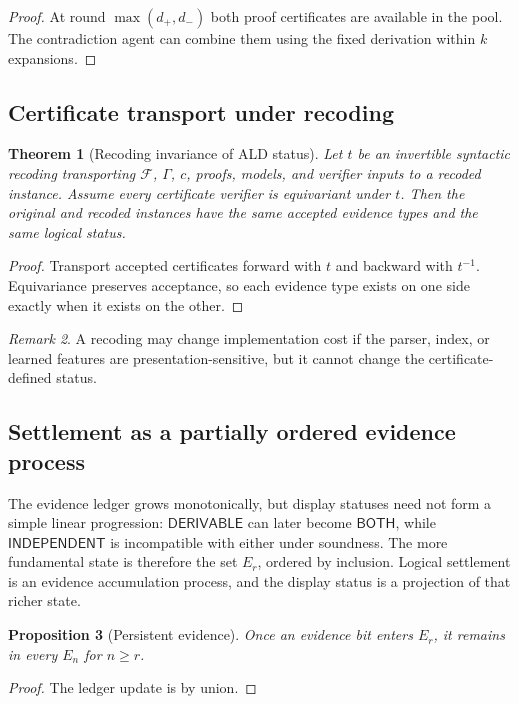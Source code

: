 \documentclass[11pt]{article}
\newtheorem{theorem}{Theorem}[section]
\newtheorem{proposition}[theorem]{Proposition}
\theoremstyle{definition}
\theoremstyle{remark}
\newtheorem{remark}[theorem]{Remark}
\newcommand{\Der}{\mathsf{DERIVABLE}}
\newcommand{\Both}{\mathsf{BOTH}}
\newcommand{\Ind}{\mathsf{INDEPENDENT}}
\newcommand{\F}{\mathcal F}
\newcommand{\Gammaa}{\Gamma}
\begin{document}
\begin{proof}
At round $\max(d_+,d_-)$ both proof certificates are available in the pool. The contradiction agent can combine them using the fixed derivation within $k$ expansions.
\end{proof}

\subsection{Certificate transport under recoding}
\begin{theorem}[Recoding invariance of ALD status]
Let $t$ be an invertible syntactic recoding transporting $\F$, $\Gammaa$, $c$, proofs, models, and verifier inputs to a recoded instance. Assume every certificate verifier is equivariant under $t$. Then the original and recoded instances have the same accepted evidence types and the same logical status.
\end{theorem}

\begin{proof}
Transport accepted certificates forward with $t$ and backward with $t^{-1}$. Equivariance preserves acceptance, so each evidence type exists on one side exactly when it exists on the other.
\end{proof}

\begin{remark}
A recoding may change implementation cost if the parser, index, or learned features are presentation-sensitive, but it cannot change the certificate-defined status.
\end{remark}

\subsection{Settlement as a partially ordered evidence process}
The evidence ledger grows monotonically, but display statuses need not form a simple linear progression: $\Der$ can later become $\Both$, while $\Ind$ is incompatible with either under soundness. The more fundamental state is therefore the set $E_r$, ordered by inclusion. Logical settlement is an evidence accumulation process, and the display status is a projection of that richer state.

\begin{proposition}[Persistent evidence]
Once an evidence bit enters $E_r$, it remains in every $E_n$ for $n\ge r$.
\end{proposition}

\begin{proof}
The ledger update is by union.
\end{proof}
\end{document}
